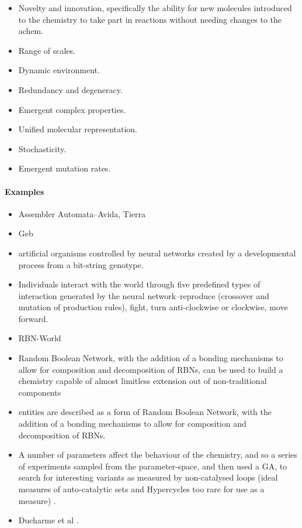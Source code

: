 \begin{itemize}
	\item
 Novelty and innovation, specifically the ability for new molecules
 introduced to the chemistry to take part in reactions without needing
 changes to the \gls{achem}.
	\item
 Range of scales.
	\item
 Dynamic environment.
	\item
 Redundancy and degeneracy.
	\item
 Emergent complex properties.
	\item
 Unified molecular representation.
	\item
 Stochasticity.
	\item
 Emergent mutation rates.
\end{itemize}

\paragraph{Examples}\label{examples}

\begin{itemize}
	\item
 Assembler Automata--Avida, Tierra
	\item
 Geb \autocite{Channon:2001ly}
	\item
 artificial organisms controlled by neural networks created by a
 developmental process from a bit-string genotype.
	\item
 Individuals interact with the world through five predefined types of
 interaction generated by the neural network--reproduce (crossover and
 mutation of production rules), fight, turn anti-clockwise or
 clockwise, move forward.
	\item
 RBN-World
	\item
 Random Boolean Network, with the addition of a bonding mechanisms to
 allow for composition and decomposition of RBNs, can be used to build
 a chemistry capable of almost limitless extension out of
 non-traditional components
	\item
 entities are described as a form of Random Boolean Network, with the
 addition of a bonding mechanisms to allow for composition and
 decomposition of RBNs.
	\item
 A number of parameters affect the behaviour of the chemistry, and so a
 series of experiments sampled from the parameter-space, and then used
 a GA, to search for interesting variants as measured by non-catalysed
 loops (ideal measures of auto-catalytic sets and Hypercycles too rare
 for use as a measure) \autocite[section 8]{Faulconbridge2011}.
	\item
 Ducharme et al \autocite{Ducharme2012}.
\end{itemize}

